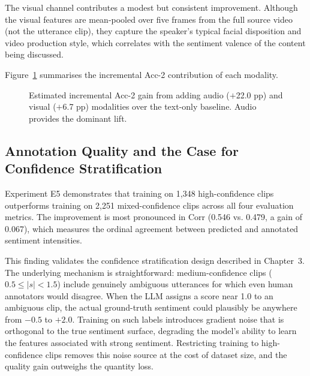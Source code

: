 The visual channel contributes a modest but consistent improvement. Although the visual features are mean-pooled over five frames from the full source video (not the utterance clip), they capture the speaker's typical facial disposition and video production style, which correlates with the sentiment valence of the content being discussed.

Figure~\ref{fig:tikz_modality_gain} summarises the incremental Acc-2 contribution of each modality.

\begin{figure}[ht]
\centering
{}
\caption{Estimated incremental Acc-2 gain from adding audio ($+$22.0 pp) and visual ($+$6.7 pp) modalities over the text-only baseline. Audio provides the dominant lift.}
\label{fig:tikz_modality_gain}
\end{figure}

\subsection{Annotation Quality and the Case for Confidence Stratification}
\label{sec:annotation_quality}

Experiment E5 demonstrates that training on 1,348 high-confidence clips outperforms training on 2,251 mixed-confidence clips across all four evaluation metrics. The improvement is most pronounced in Corr (0.546 vs. 0.479, a gain of 0.067), which measures the ordinal agreement between predicted and annotated sentiment intensities.

This finding validates the confidence stratification design described in Chapter~3. The underlying mechanism is straightforward: medium-confidence clips ($0.5 \leq |s| < 1.5$) include genuinely ambiguous utterances for which even human annotators would disagree. When the LLM assigns a score near 1.0 to an ambiguous clip, the actual ground-truth sentiment could plausibly be anywhere from $-0.5$ to $+2.0$. Training on such labels introduces gradient noise that is orthogonal to the true sentiment surface, degrading the model's ability to learn the features associated with strong sentiment. Restricting training to high-confidence clips removes this noise source at the cost of dataset size, and the quality gain outweighs the quantity loss.

